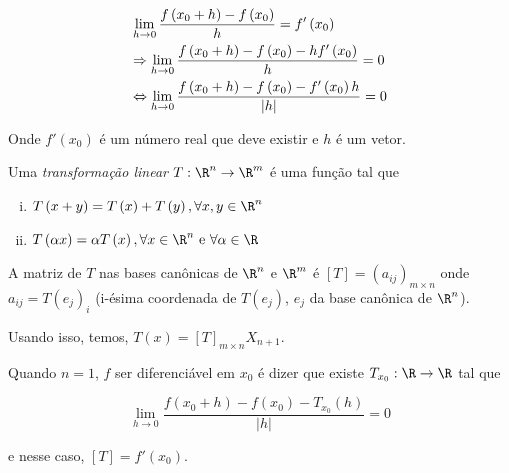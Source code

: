 \documentclass{book}
\begin{document}
\[
\begin{gathered}
  \mathop {\lim }\limits_{h \to 0} \frac{{f\left( {x_0  + h} \right) - f\left( {x_0 } \right)}}
{h} = f'\left( {x_0 } \right) \hfill \\
   \Rightarrow \mathop {\lim }\limits_{h \to 0} \frac{{f\left( {x_0  + h} \right) - f\left( {x_0 } \right) - hf'\left( {x_0 } \right)}}
{h} = 0 \hfill \\
   \Leftrightarrow \mathop {\lim }\limits_{h \to 0} \frac{{f\left( {x_0  + h} \right) - f\left( {x_0 } \right) - f'\left( {x_0 } \right)h}}
{{\left| h \right|}} = 0 \hfill \\
\end{gathered}
\]

Onde $f'\left( {x_0 } \right)$ \'e um n\'umero real que deve existir e $h$ \'e um vetor.

\begin{defn}
\begin{sloppypar}
Uma \textit{transforma\c c\~ao linear} ${T:\R^n  \to \R^m}$ \'e uma fun\c c\~ao tal que
\end{sloppypar}


\begin{enumerate}[i)]
      \item $T\left( {x + y} \right) = T\left( x \right) + T\left( y \right),\forall x,y \in \R^n$
      \item $T\left( {\alpha x} \right) = \alpha T\left( x \right),\forall x \in \R^n {\text{ e }}\forall \alpha  \in \R$
\end{enumerate}
\end{defn}

\begin{defn}
    A matriz de $T$ nas bases can\^onicas de $\R^n$ e $\R^m$ \'e $\left[ T \right] = \left( {a_{ij} } \right)_{m \times n}$ onde $a_{ij}  = T\left( {e_j } \right)_i$ (i-\'esima coordenada de $T\left( {e_j } \right)$, $e_j$ da base can\^onica de $\R^n$).

    Usando isso, temos, $T\left( x \right) = \left[ T \right]_{m \times n} X_{n + 1}$.

    Quando $n=1$, $f$ ser diferenci\'avel em $x_0$ \'e dizer que existe $T_{x_0 } :\R \to \R$ tal que

\[
    \mathop {\lim }\limits_{h \to 0} \frac{{f\left( {x_0  + h} \right) - f\left( {x_0 } \right) - T_{x_0 } \left( h \right)}}{{\left| h \right|}} = 0
\]

e nesse caso, $\left[ T \right] = f'\left( {x_0 } \right)$.
\end{defn}
\end{document}
